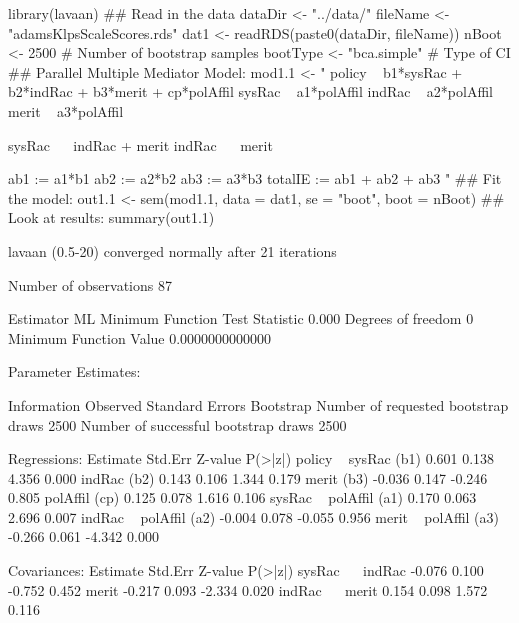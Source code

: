 \begin{Schunk}
\begin{Sinput}
 library(lavaan)
 ## Read in the data
 dataDir <- "../data/"
 fileName <- "adamsKlpsScaleScores.rds"
 dat1 <- readRDS(paste0(dataDir, fileName))
 nBoot <- 2500 # Number of bootstrap samples
 bootType <- "bca.simple" # Type of CI
 ## Parallel Multiple Mediator Model:
 mod1.1 <- "
 policy ~ b1*sysRac + b2*indRac + b3*merit + cp*polAffil
 sysRac ~ a1*polAffil
 indRac ~ a2*polAffil
 merit ~ a3*polAffil
 
 sysRac ~~ indRac + merit
 indRac ~~ merit
 
 ab1 := a1*b1
 ab2 := a2*b2
 ab3 := a3*b3
 totalIE := ab1 + ab2 + ab3
 "
 ## Fit the model:
 out1.1 <- 
     sem(mod1.1, data = dat1, se = "boot", boot = nBoot)
 ## Look at results:
 summary(out1.1)
\end{Sinput}
\begin{Soutput}
lavaan (0.5-20) converged normally after  21 iterations

  Number of observations                            87

  Estimator                                         ML
  Minimum Function Test Statistic                0.000
  Degrees of freedom                                 0
  Minimum Function Value               0.0000000000000

Parameter Estimates:

  Information                                 Observed
  Standard Errors                            Bootstrap
  Number of requested bootstrap draws             2500
  Number of successful bootstrap draws            2500

Regressions:
                   Estimate  Std.Err  Z-value  P(>|z|)
  policy ~                                            
    sysRac    (b1)    0.601    0.138    4.356    0.000
    indRac    (b2)    0.143    0.106    1.344    0.179
    merit     (b3)   -0.036    0.147   -0.246    0.805
    polAffil  (cp)    0.125    0.078    1.616    0.106
  sysRac ~                                            
    polAffil  (a1)    0.170    0.063    2.696    0.007
  indRac ~                                            
    polAffil  (a2)   -0.004    0.078   -0.055    0.956
  merit ~                                             
    polAffil  (a3)   -0.266    0.061   -4.342    0.000

Covariances:
                   Estimate  Std.Err  Z-value  P(>|z|)
  sysRac ~~                                           
    indRac           -0.076    0.100   -0.752    0.452
    merit            -0.217    0.093   -2.334    0.020
  indRac ~~                                           
    merit             0.154    0.098    1.572    0.116


\end{Soutput}
\end{Schunk}
